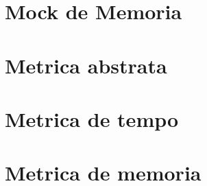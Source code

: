 \documentclass[12pt]{tcc}
\begin{document}
\section{Mock de Memoria}


\section{Metrica abstrata}


\section{Metrica de tempo}


\section{Metrica de memoria}

\end{document}
